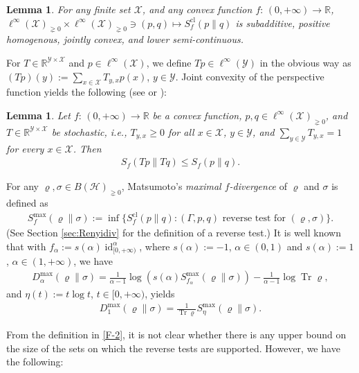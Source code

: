 \documentclass[unsortedaddress,superscriptaddress,pra,notitlepage]{revtex4}
\newtheorem{lemma}[definition]{Lemma}
\def\X{{\mathcal X}}
\def\Y{{\mathcal Y}}
\def\bR{\mathbb{R}}
\def\rho{\varrho}
\def\bz{\left(}
\def\jz{\right)}
\def\pne{_{\gneq 0}}
\def\cl{\mathrm{cl}}
\def\cH{\mathcal{H}}
\def\cl{\mathrm{cl}}
\newcommand{\ki}[1]{\textit{\textit{#1}}}
\DeclareMathOperator{\id}{id}
\DeclareMathOperator{\Tr}{Tr}
\begin{document}
\begin{lemma}\label{lemma:cl fdiv properties}
For any finite set $\X$, and any convex function $f:\,(0,+\infty)\to\bR$, 
$\ell^{\infty}(\X)\pne\times\ell^{\infty}(\X)\pne\ni(p,q)\mapsto S_f^{\cl}(p\|q)$ is 
subadditive, positive homogenous, jointly convex, and lower semi-continuous. 
\end{lemma}

For $T\in\bR^{\Y\times\X}$ and $p\in\ell^{\infty}(\X)$, we define $Tp\in\ell^{\infty}(\Y)$ in the obvious way as $(Tp)(y):=\sum_{x\in\X}T_{y,x}p(x)$, $y\in\Y$. Joint convexity of the perspective function yields the following (see \cite{Csiszarfdiv1} or \cite[Proposition A.3]{HMPB}):

\begin{lemma}\label{lemma:cl fdiv mon}
Let $f:\,(0,+\infty)\to\bR$ be a convex function, $p,q\in\ell^{\infty}(\X)\pne$, and 
$T\in\bR^{\Y\times\X}$ be stochastic, i.e., $T_{y,x}\ge 0$ for all $x\in\X$, $y\in\Y$, and 
$\sum_{y\in\Y}T_{y,x}=1$ for every $x\in\X$. Then 
\begin{align*}
S_f(Tp\|Tq)\le S_f(p\|q).
\end{align*}
\end{lemma}

For any $\rho,\sigma\in B(\cH)\pne$, 
Matsumoto's \ki{maximal $f$-divergence} of $\rho$ and $\sigma$
is defined as \cite{Matsumoto_newfdiv}
\begin{align}\label{F-2}
S_f^{\max}(\rho\|\sigma):=\inf\bigl\{S_f^\cl(p\|q):
\mbox{$(\Gamma,p,q)$ reverse test for $(\rho,\sigma)$}\bigr\}.
\end{align}
(See Section \ref{sec:Renyidiv} for the definition of a reverse test.)
It is well known that with $f_{\alpha}:=s(\alpha)\id_{[0,+\infty)}^{\alpha}$, 
where $s(\alpha):=-1$, $\alpha\in(0,1)$ and $s(\alpha):=1$, $\alpha\in(1,+\infty)$, 
we have 
\begin{align}\label{max Renyi from maxfdiv}
D_{\alpha}^{\max}(\rho\|\sigma)=\frac{1}{\alpha-1}\log
\bz s(\alpha)S_{f_{\alpha}}^{\max}(\rho\|\sigma)\jz
-\frac{1}{\alpha-1}\log\Tr\rho,
\end{align}
and $\eta(t):=t\log t$, $t\in[0,+\infty)$, yields
\begin{align}\label{maxrelentr}
D_1^{\max}(\rho\|\sigma)=\frac{1}{\Tr\rho}S_{\eta}^{\max}(\rho\|\sigma).
\end{align}
\medskip

From the definition in \eqref{F-2}, it is not clear whether there is any upper bound on the size of the sets on which the reverse tests are supported. However, we have the following:
\end{document}
